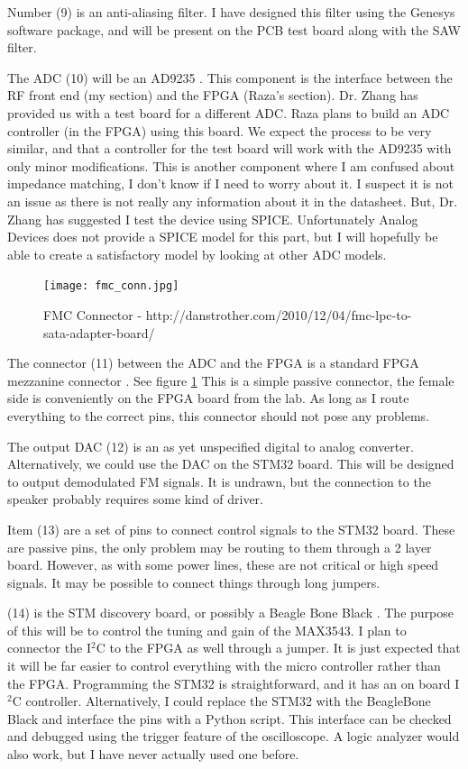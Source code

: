\documentclass[a4paper, 12pt]{article}
\begin{document}
Number (9) is an anti-aliasing filter.  I have designed this filter using the Genesys \cite{genesys} software package, and will be present on the PCB test board along with the SAW filter.

The ADC (10) will be an AD9235 \cite{ad9235}.  This component is the interface between the RF front end (my section) and the FPGA (Raza's section).  Dr. Zhang has provided us with a test board for a different ADC.  Raza plans to build an ADC controller (in the FPGA) using this board.  We expect the process to be very similar, and that a controller for the test board will work with the AD9235 with only minor modifications.  This is another component where I am confused about impedance matching, I don't know if I need to worry about it.  I suspect it is not an issue as there is not really any information about it in the datasheet.  But, Dr. Zhang has suggested I test the device using SPICE.  Unfortunately Analog Devices does not provide a SPICE model for this part, but I will hopefully be able to create a satisfactory model by looking at other ADC models.

\begin{figure}
\caption{FMC Connector - http://danstrother.com/2010/12/04/fmc-lpc-to-sata-adapter-board/}
\label{fig:fmc_conn}
\texttt{[image: fmc\_conn.jpg]}
\end{figure}

The connector (11) between the ADC and the FPGA is a standard FPGA mezzanine connector \cite{fmc}.  See figure \ref{fig:fmc_conn}  This is a simple passive connector, the female side is conveniently on the FPGA board from the lab.  As long as I route everything to the correct pins, this connector should not pose any problems.

The output DAC (12) is an as yet unspecified digital to analog converter.  Alternatively, we could use the DAC on the STM32 board.  This will be designed to output demodulated FM signals.  It is undrawn, but the connection to the speaker probably requires some kind of driver.

Item (13) are a set of pins to connect control signals to the STM32 board.  These are passive pins, the only problem may be routing to them through a 2 layer board.  However, as with some power lines, these are not critical or high speed signals.  It may be possible to connect things through long jumpers.

(14) is the STM discovery board, or possibly a Beagle Bone Black \cite{bbb}.  The purpose of this will be to control the tuning and gain of the MAX3543.  I plan to connector the I$^2$C to the FPGA as well through a jumper.  It is just expected that it will be far easier to control everything with the micro controller rather than the FPGA.  Programming the STM32 is straightforward, and it has an on board I$^2$C controller.  Alternatively, I could replace the STM32 with the BeagleBone Black and interface the pins with a Python script.  This interface can be checked and debugged using the trigger feature of the oscilloscope.  A logic analyzer would also work, but I have never actually used one before.
\end{document}
